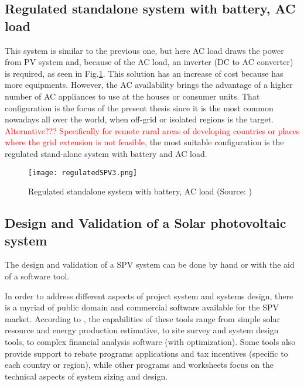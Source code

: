 \subsection{Regulated standalone system with battery, AC load}
This system is similar to the previous one, but here AC load draws the power from PV system and, because of the AC load, an inverter (DC to AC converter) is required, as seen in Fig.\ref{fig:regSPV3}. This solution has an increase of cost because has more equipments. However, the AC availability brings the advantage of a higher number of AC appliances to use at the houses or consumer units. That configuration is the focus of the present thesis since it is the most common nowadays all over the world, when off-grid or isolated regions is the target. \textcolor{red} { Alternative??? Specifically for remote rural areas of developing countries or places where the grid extension is not feasible,}
the most suitable configuration is the regulated stand-alone system with battery and AC load.

\begin{figure}[h]
\texttt{[image: regulatedSPV3.png]}
\centering
\caption{Regulated standalone system with battery, AC load (Source: \cite{Roy})}
\label{fig:regSPV3}
\end{figure}

\subsection{Design and Validation of a Solar photovoltaic system}
The design and validation of a SPV system can be done by hand or with the aid of a software tool. 

In order to address different aspects of project system and systems design, there is a myriad of public domain and commercial software available for the SPV market. According to \cite{Brooks}, the capabilities of these tools range from simple solar resource and energy production estimative, to site survey and system design tools, to complex financial analysis software (with optimization). Some tools also provide support to rebate programs applications and tax incentives (specific to each country or region), while other programs and worksheets focus on the technical aspects of system sizing and design.
 
